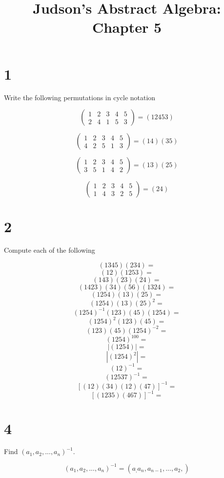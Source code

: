 \documentclass[a4paper]{article}
\title{Judson's Abstract Algebra: Chapter 5}
\date{}
\begin{document}
\maketitle

\section*{1}

Write the following permutations in cycle notation

$$
\begin{pmatrix}
1 & 2 & 3 & 4 & 5 \\
2 & 4 & 1 & 5 & 3
\end{pmatrix}
= (12453)$$

$$
\begin{pmatrix}
1 & 2 & 3 & 4 & 5 \\
4 & 2 & 5 & 1 & 3
\end{pmatrix}
= (14)(35)$$

$$
\begin{pmatrix}
1 & 2 & 3 & 4 & 5 \\
3 & 5 & 1 & 4 & 2
\end{pmatrix}
= (13)(25)$$

$$
\begin{pmatrix}
1 & 2 & 3 & 4 & 5 \\
1 & 4 & 3 & 2 & 5
\end{pmatrix}
= (24)$$


\section*{2}

Compute each of the following

$$(1345)(234) = $$
$$(12)(1253) = $$
$$(143)(23)(24) = $$
$$(1423)(34)(56)(1324) = $$
$$(1254)(13)(25) = $$
$$(1254)(13)(25)^2 = $$
$$(1254)^{-1}(123)(45)(1254) = $$
$$(1254)^2(123)(45) = $$
$$(123)(45)(1254)^{-2} = $$
$$(1254)^{100} = $$
$$|(1254)| = $$
$$|(1254)^2| = $$
$$(12)^{-1} = $$
$$(12537)^{-1} = $$
$$[(12)(34)(12)(47)]^{-1} = $$
$$[(1235)(467)]^{-1} = $$



\section*{4}

Find $(a_1, a_2, ..., a_n)^{-1}$.

$$(a_1, a_2, ..., a_n)^{-1} = (a_, a_n, a_{n-1}, ..., a_2,)$$
\end{document}
